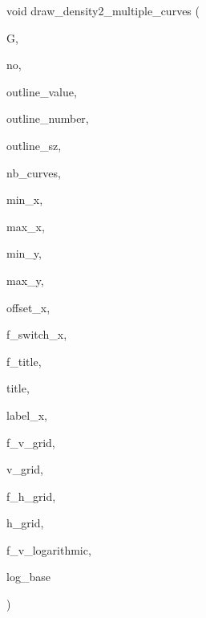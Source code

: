 {\footnotesize\ttfamily void draw\+\_\+density2\+\_\+multiple\+\_\+curves (\begin{DoxyParamCaption}\item[{\mbox{\hyperlink{classmp__graphics}{mp\+\_\+graphics}} \&}]{G,  }\item[{\mbox{\hyperlink{galois_8h_a09fddde158a3a20bd2dcadb609de11dc}{I\+NT}}}]{no,  }\item[{\mbox{\hyperlink{galois_8h_a09fddde158a3a20bd2dcadb609de11dc}{I\+NT}} $\ast$$\ast$}]{outline\+\_\+value,  }\item[{\mbox{\hyperlink{galois_8h_a09fddde158a3a20bd2dcadb609de11dc}{I\+NT}} $\ast$$\ast$}]{outline\+\_\+number,  }\item[{\mbox{\hyperlink{galois_8h_a09fddde158a3a20bd2dcadb609de11dc}{I\+NT}} $\ast$}]{outline\+\_\+sz,  }\item[{\mbox{\hyperlink{galois_8h_a09fddde158a3a20bd2dcadb609de11dc}{I\+NT}}}]{nb\+\_\+curves,  }\item[{\mbox{\hyperlink{galois_8h_a09fddde158a3a20bd2dcadb609de11dc}{I\+NT}}}]{min\+\_\+x,  }\item[{\mbox{\hyperlink{galois_8h_a09fddde158a3a20bd2dcadb609de11dc}{I\+NT}}}]{max\+\_\+x,  }\item[{\mbox{\hyperlink{galois_8h_a09fddde158a3a20bd2dcadb609de11dc}{I\+NT}}}]{min\+\_\+y,  }\item[{\mbox{\hyperlink{galois_8h_a09fddde158a3a20bd2dcadb609de11dc}{I\+NT}}}]{max\+\_\+y,  }\item[{\mbox{\hyperlink{galois_8h_a09fddde158a3a20bd2dcadb609de11dc}{I\+NT}}}]{offset\+\_\+x,  }\item[{\mbox{\hyperlink{galois_8h_a09fddde158a3a20bd2dcadb609de11dc}{I\+NT}}}]{f\+\_\+switch\+\_\+x,  }\item[{\mbox{\hyperlink{galois_8h_a09fddde158a3a20bd2dcadb609de11dc}{I\+NT}}}]{f\+\_\+title,  }\item[{const \mbox{\hyperlink{galois_8h_ab6cc7b4aeb6ea31aba2b3fbfc83ff5e6}{B\+Y\+TE}} $\ast$}]{title,  }\item[{const \mbox{\hyperlink{galois_8h_ab6cc7b4aeb6ea31aba2b3fbfc83ff5e6}{B\+Y\+TE}} $\ast$}]{label\+\_\+x,  }\item[{\mbox{\hyperlink{galois_8h_a09fddde158a3a20bd2dcadb609de11dc}{I\+NT}}}]{f\+\_\+v\+\_\+grid,  }\item[{\mbox{\hyperlink{galois_8h_a09fddde158a3a20bd2dcadb609de11dc}{I\+NT}}}]{v\+\_\+grid,  }\item[{\mbox{\hyperlink{galois_8h_a09fddde158a3a20bd2dcadb609de11dc}{I\+NT}}}]{f\+\_\+h\+\_\+grid,  }\item[{\mbox{\hyperlink{galois_8h_a09fddde158a3a20bd2dcadb609de11dc}{I\+NT}}}]{h\+\_\+grid,  }\item[{\mbox{\hyperlink{galois_8h_a09fddde158a3a20bd2dcadb609de11dc}{I\+NT}}}]{f\+\_\+v\+\_\+logarithmic,  }\item[{double}]{log\+\_\+base }\end{DoxyParamCaption})}

